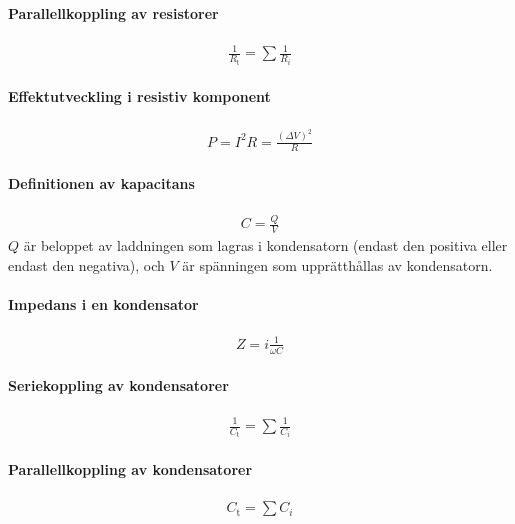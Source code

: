 \deriv

\paragraph{Parallellkoppling av resistorer}
\begin{align*}
	\frac{1}{R_\text{t}} = \sum \frac{1}{R_i}
\end{align*}

\deriv

\paragraph{Effektutveckling i resistiv komponent}
\begin{align*}
	P = I^2R = \frac{(\Delta V)^2}{R}
\end{align*}

\paragraph{Definitionen av kapacitans}
\begin{align*}
	C = \frac{Q}{V}
\end{align*}
$Q$ är beloppet av laddningen som lagras i kondensatorn (endast den positiva eller endast den negativa), och $V$ är spänningen som upprätthållas av kondensatorn.

\paragraph{Impedans i en kondensator}
\begin{align*}
	Z = i\frac{1}{\omega C}
\end{align*}

\paragraph{Seriekoppling av kondensatorer}
\begin{align*}
	\frac{1}{C_\text{t}} = \sum\frac{1}{C_i}
\end{align*}

\deriv

\paragraph{Parallellkoppling av kondensatorer}
\begin{align*}
	C_\text{t} = \sum C_i
\end{align*}

